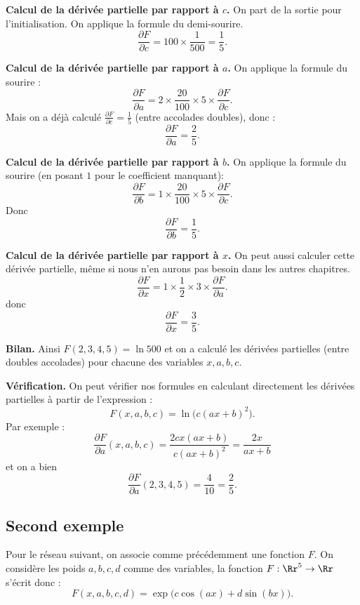 \documentclass[11pt,class=report,crop=false]{standalone}
\begin{document}
\textbf{Calcul de la dérivée partielle par rapport à $c$.}
On part de la sortie pour l'initialisation. On applique la formule du demi-sourire.
$$\frac{\partial F}{\partial c} = 100 \times \frac{1}{500} = \frac15.$$

\textbf{Calcul de la dérivée partielle par rapport à $a$.}
On applique la formule du sourire :
$$\frac{\partial F}{\partial a} = 2 \times \frac{20}{100} \times 5 \times \frac{\partial F}{\partial c}.$$
Mais on a déjà calculé $\frac{\partial F}{\partial c}=\frac15$ (entre accolades doubles), donc :
$$\frac{\partial F}{\partial a} = \frac25.$$

\textbf{Calcul de la dérivée partielle par rapport à $b$.}
On applique la formule du sourire (en posant $1$ pour le coefficient manquant):
$$\frac{\partial F}{\partial b} = 1 \times \frac{20}{100} \times 5 \times \frac{\partial F}{\partial c}.$$
Donc 
$$\frac{\partial F}{\partial b} = \frac15.$$

\textbf{Calcul de la dérivée partielle par rapport à $x$.}
On peut aussi calculer cette dérivée partielle, même si nous n'en aurons pas besoin dans les autres chapitres. 
$$\frac{\partial F}{\partial x} = 1 \times \frac{1}{2} \times 3 \times \frac{\partial F}{\partial a}.$$
donc 
$$\frac{\partial F}{\partial x} = \frac{3}{5}.$$

\textbf{Bilan.}
Ainsi $F(2,3,4,5)=\ln 500$ et on a calculé les dérivées partielles (entre doubles accolades) pour chacune des variables $x,a,b,c$.

\textbf{Vérification.}
On peut vérifier nos formules en calculant directement les dérivées partielles à partir de l'expression :
$$F(x,a,b,c) = \ln\big( c (ax+b)^2 \big).$$
Par exemple :
$$\frac{\partial F}{\partial a}(x,a,b,c) = \frac{2cx(ax+b)}{c(ax+b)^2} = \frac{2x}{ax+b}$$
et on a bien 
$$\frac{\partial F}{\partial a}(2,3,4,5) = \frac{4}{10} = \frac25.$$

\subsection{Second exemple}

Pour le réseau suivant, on associe comme précédemment une fonction $F$. 
On considère les poids $a,b,c,d$ comme des variables, la fonction $F : \Rr^5 \to \Rr$ s'écrit donc :
$$F(x,a,b,c,d) = \exp\big(c \cos(ax) + d\sin(bx)\big).$$
\end{document}
